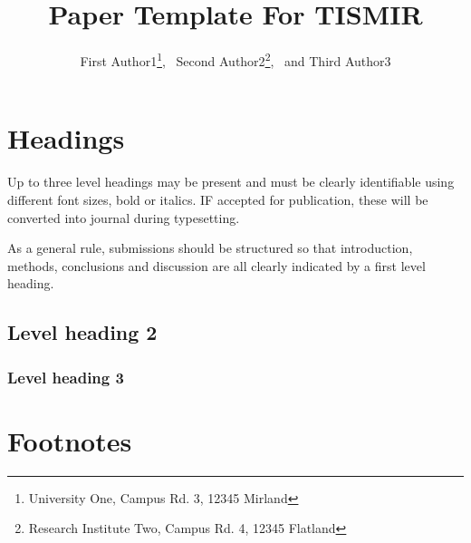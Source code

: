 \documentclass{article}
\title{Paper Template For TISMIR}
\author{%
First Author1\thanks{University One, Campus Rd. 3, 12345 Mirland},%
~Second Author2\thanks{Research Institute Two, Campus Rd. 4, 12345 Flatland},%
~and Third Author3\protect\footnotemark[1]}
\date{}
\begin{document}

\saythanks{}


\section{Headings}\label{sec:headings}

Up to three level headings may be present and must be clearly identifiable
using different font sizes, bold or italics. IF accepted for publication,
these will be converted into journal during typesetting.

As a general rule, submissions should be structured so that introduction,
methods, conclusions and discussion are all clearly indicated by a first level heading.

\subsection{Level heading 2}

\lipsum[1]

\subsubsection{Level heading 3}

\lipsum[2]

\section{Footnotes}\label{sec:footnotes}
\end{document}
